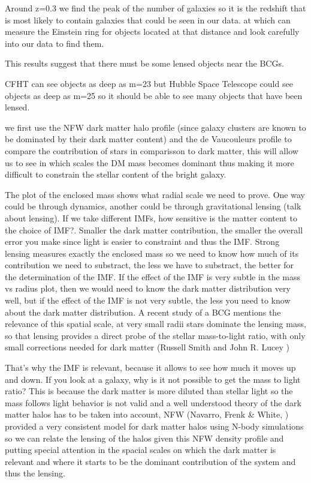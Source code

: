 Around z=0.3 we find the peak of the number of galaxies so it is the redshift that is most likely to contain galaxies that could be seen in our data. at which can measure the Einstein ring for objects located at that distance and look carefully into our data to find them.

This results suggest that there must be some lensed objects near the BCGs.

CFHT can see objects as deep as m=23 but Hubble Space Telescope could see objects as deep as m=25 so it should be able to see many objects that have been lensed.

 we first use the NFW dark matter halo profile (since galaxy clusters are known to be dominated by their dark matter content) and the de Vaucouleurs profile to compare the contribution of stars in comparisson to dark matter, this will allow us to see in which scales the DM mass becomes dominant thus making it more difficult to constrain the stellar content of the bright galaxy.

The plot of the enclosed mass shows what radial scale we need to prove. One way could be through dynamics, another could be through gravitational lensing (talk about lensing). If we take different IMFs, how sensitive is the matter content to the choice of IMF?. Smaller the dark matter contribution, the smaller the overall error you make since light is easier to constraint and thus the IMF. Strong lensing measures exactly the enclosed mass so we need to know how much of its contribution we need to substract, the less we have to substract, the better for the determination of the IMF. If the effect of the IMF is very subtle in the mass vs radius plot, then we would need to know the dark matter distribution very well, but if the effect of the IMF is not very subtle, the less you need to know about the dark matter distribution. A recent study of a BCG mentions the relevance of this spatial scale, at very small radii stars dominate the lensing mass, so that lensing provides a direct probe of the stellar mass-to-light ratio, with only small corrections needed for dark matter (Russell Smith and John R. Lucey \citeyear{Reference7}) 

That's why the IMF is relevant, because it allows to see how much it moves up and down. If you look at a galaxy, why is it not possible to get the mass to light ratio? This is because the dark matter is more diluted than stellar light so the mass follows light behavior is not valid and a well understood theory of the dark matter halos has to be taken into account, NFW (Navarro, Frenk \& White, \citeyear{Reference17}) provided a very consistent model for dark matter halos using N-body simulations so we can relate the lensing of the halos given this NFW density profile and putting special attention in the spacial scales on which the dark matter is relevant and where it starts to be the dominant contribution of the system and thus the lensing.

